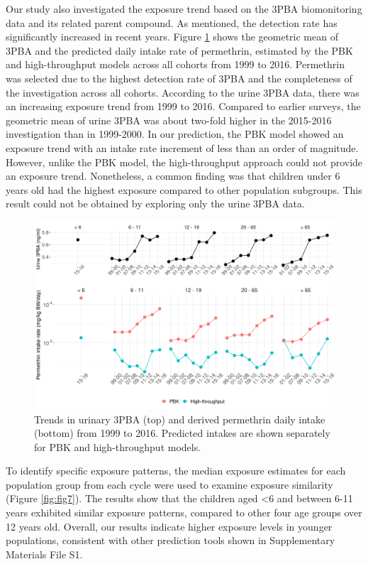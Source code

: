 \documentclass[toxics,article,submit,pdftex,moreauthors]{Definitions/mdpi}
\begin{document}
Our study also investigated the exposure trend based on the 3PBA
biomonitoring data and its related parent compound. As mentioned, the
detection rate has significantly increased in recent years. Figure
\ref{fig:fig6} shows the geometric mean of 3PBA and the predicted daily
intake rate of permethrin, estimated by the PBK and high-throughput
models across all cohorts from 1999 to 2016. Permethrin was selected due
to the highest detection rate of 3PBA and the completeness of the
investigation across all cohorts. According to the urine 3PBA data,
there was an increasing exposure trend from 1999 to 2016. Compared to
earlier surveys, the geometric mean of urine 3PBA was about two-fold
higher in the 2015-2016 investigation than in 1999-2000. In our
prediction, the PBK model showed an exposure trend with an intake rate
increment of less than an order of magnitude. However, unlike the PBK
model, the high-throughput approach could not provide an exposure trend.
Nonetheless, a common finding was that children under 6 years old had
the highest exposure compared to other population subgroups. This result
could not be obtained by exploring only the urine 3PBA data.

\begin{figure}[H]
\centering
\begin{adjustwidth}{-2cm}{}
\centering
\includegraphics[width=\linewidth]{figures/fig6}
\hfill
\end{adjustwidth}
\caption{Trends in urinary 3PBA (top) and derived permethrin daily intake (bottom) from 1999
to 2016. Predicted intakes are shown separately for PBK and high-throughput models.\label{fig:fig6}}
\end{figure}

To identify specific exposure patterns, the median exposure estimates
for each population group from each cycle were used to examine exposure
similarity (Figure \ref{fig:fig7}). The results show that the children
aged \textless6 and between 6-11 years exhibited similar exposure
patterns, compared to other four age groups over 12 years old. Overall,
our results indicate higher exposure levels in younger populations,
consistent with other prediction tools shown in Supplementary Materials
File S1.
\end{document}

